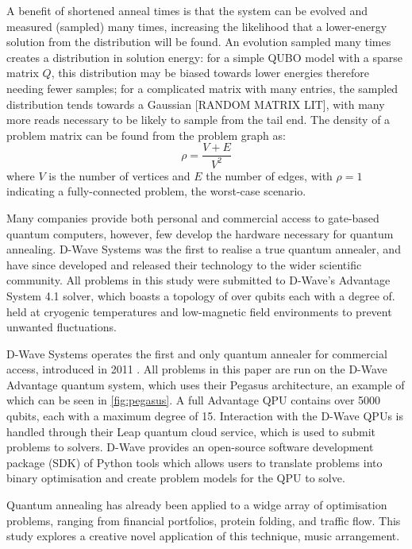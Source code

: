 \documentclass[12pt]{article}
\theoremstyle{definition}
\begin{document}
A benefit of shortened anneal times is that the system can be evolved and measured (sampled) many times, increasing the likelihood that a lower-energy solution from the distribution will be found. An evolution sampled many times creates a distribution in solution energy: for a simple QUBO model with a sparse matrix $Q$, this distribution may be biased towards lower energies therefore needing fewer samples; for a complicated matrix with many entries, the sampled distribution tends towards a Gaussian [RANDOM MATRIX LIT], with many more reads necessary to be likely to sample from the tail end. The density of a problem matrix can be found from the problem graph as:
\begin{equation}
    \rho=\frac{V+E}{V^2}
\end{equation}
where $V$ is the number of vertices and $E$ the number of edges, with $\rho=1$ indicating a fully-connected problem, the worst-case scenario.

Many companies provide both personal and commercial access to gate-based quantum computers, however, few develop the hardware necessary for quantum annealing. D-Wave Systems was the first to realise a true quantum annealer, and have since developed and released their technology to the wider scientific community. All problems in this study were submitted to D-Wave's Advantage System 4.1 solver, which boasts a topology of over qubits each with a degree of. held at cryogenic temperatures and low-magnetic field environments to prevent unwanted fluctuations.

D-Wave Systems operates the first and only quantum annealer for commercial access, introduced in 2011 . All problems in this paper are run on the D-Wave Advantage quantum system, which uses their Pegasus architecture, an example of which can be seen in \cref{fig:pegasus}. A full Advantage QPU contains over \num{5000} qubits, each with a maximum degree of \num{15}.
Interaction with the D-Wave QPUs is handled through their Leap quantum cloud service, which is used to submit problems to solvers. D-Wave provides an open-source software development package (SDK) of Python tools which allows users to translate problems into binary optimisation and create problem models for the QPU to solve.

Quantum annealing has already been applied to a widge array of optimisation problems, ranging from financial portfolios, protein folding, and traffic flow. This study explores a creative novel application of this technique, music arrangement.
\end{document}
